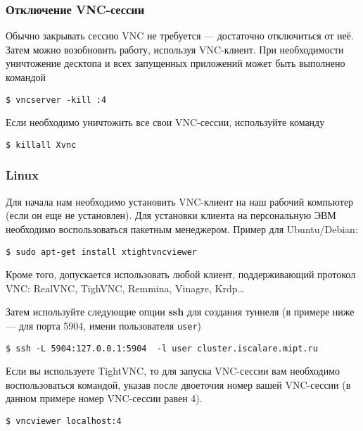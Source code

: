 \subsubsection{Отключение VNC-сессии}

Обычно закрывать сессию VNC не требуется --- достаточно отключиться от неё. Затем можно возобновить работу, используя VNC-клиент. При необходимости уничтожение десктопа и всех запущенных приложений может быть выполнено командой

\begin{lstlisting}
$ vncserver -kill :4
\end{lstlisting}

Если необходимо уничтожить все свои VNC-сессии, используйте команду

\begin{lstlisting}
$ killall Xvnc
\end{lstlisting}

\subsubsection{Linux}

Для начала нам необходимо установить VNC-клиент на наш рабочий компьютер (если он еще не установлен). Для установки клиента на персональную ЭВМ необходимо воспользоваться пакетным менеджером. Пример для Ubuntu/Debian:

\begin{lstlisting}
$ sudo apt-get install xtightvncviewer
\end{lstlisting}

Кроме того, допускается использовать любой клиент, поддерживающий протокол VNC: RealVNC, TighVNC, Remmina, Vinagre, Krdp\dots

Затем используйте следующие опции \textbf{ssh} для создания туннеля (в примере ниже  --- для порта 5904, имени пользователя \texttt{user})

\begin{lstlisting}
$ ssh -L 5904:127.0.0.1:5904  -l user cluster.iscalare.mipt.ru
\end{lstlisting}

Если вы используете TightVNC, то для запуска VNC-сессии вам необходимо воспользоваться командой, указав после двоеточия номер вашей VNC-сессии (в данном примере номер VNC-сессии равен 4).

\begin{lstlisting}
$ vncviewer localhost:4
\end{lstlisting}

